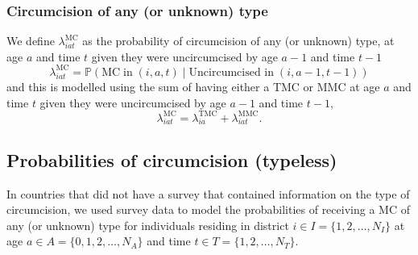 \documentclass{article}
\begin{document}
\begin{appendix}

\subsubsection*{Circumcision of any (or unknown) type}


\noindent We define $\lambda^{\text{MC}}_{iat}$ as the probability of circumcision of any (or unknown) type, at age $a$ and time $t$ given they were uncircumcised by age $a-1$ and time $t-1$ 
\begin{equation*}
	\lambda^{\text{MC}}_{iat} = \mathbb{P}(\text{MC} \; \text{in} \; (i,a,t) \; | \; \text{Uncircumcised in} \; (i,a-1,t-1))
\end{equation*}
and this is modelled using the sum of having either a TMC or MMC at age $a$ and time $t$ given they were uncircumcised by age $a-1$ and time $t-1$,
\begin{equation*}
	\lambda^{\text{MC}}_{iat} = \lambda^{\text{TMC}}_{ia} + \lambda^{\text{MMC}}_{iat}. 
\end{equation*}


\subsection{Probabilities of circumcision (typeless)}
\label{sec::typeless}


In countries that did not have a survey that contained information on the type of circumcision, we used survey data to model the probabilities of receiving a MC of any (or unknown) type for individuals residing in district $i \in I = \{1, 2, \ldots, N_I\}$ at age $a \in A = \{0, 1, 2, \ldots, N_A\}$ and time $t \in T = \{1, 2, \ldots, N_T\}$. 


\end{appendix}
\end{document}

